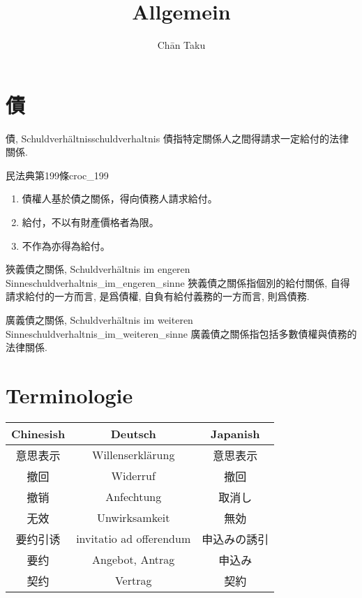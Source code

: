 \documentclass{article}
\title{Allgemein}
\author{Ch\=an Taku}
\begin{document}
\maketitle

\section{債}

\begin{definition}{債, Schuldverhältnis}{schuldverhaltnis}
    債指特定關係人之間得請求一定給付的法律關係.
\end{definition}

\begin{proposition}{民法典第199條}{croc_199}
    \begin{enumerate}
        \item 債權人基於債之關係，得向債務人請求給付。
        \item 給付，不以有財產價格者為限。
        \item 不作為亦得為給付。
    \end{enumerate}
\end{proposition}

\begin{definition}{狹義債之關係, Schuldverhältnis im engeren Sinne}{schuldverhaltnis_im_engeren_sinne}
    狹義債之關係指個別的給付關係, 自得請求給付的一方而言, 是爲債權, 自負有給付義務的一方而言, 則爲債務.
\end{definition}

\begin{definition}{廣義債之關係, Schuldverhältnis im weiteren Sinne}{schuldverhaltnis_im_weiteren_sinne}
    廣義債之關係指包括多數債權與債務的法律關係.
\end{definition}

\section{Terminologie}

\begin{longtable}{ccc}
    \toprule
    Chinesish & Deutsch & Japanish \\
    \midrule
    意思表示 & Willenserkl\"arung & 意思表示 \\
    撤回 & Widerruf & 撤回 \\
    撤销 & Anfechtung & 取消し \\
    无效 & Unwirksamkeit & 無効 \\
    要约引诱 & invitatio ad offerendum & 申込みの誘引 \\
    要约 & Angebot, Antrag & 申込み \\
    契约 & Vertrag & 契約 \\
    \bottomrule
\end{longtable}

% 
% 
\end{document}
